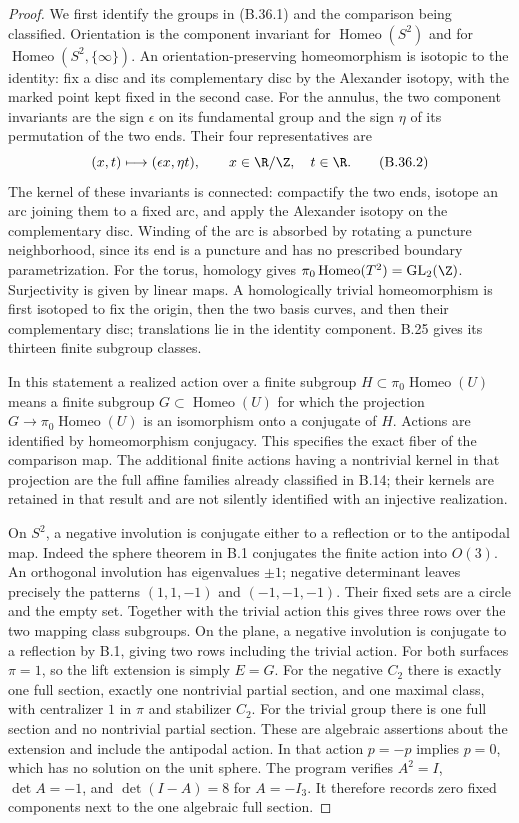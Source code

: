 \begin{proof}
We first identify the groups in (B.36.1) and the comparison being
classified.  Orientation is the component invariant for
$\operatorname{Homeo}(S^2)$ and for
$\operatorname{Homeo}(S^2,\{\infty\})$.
An orientation-preserving homeomorphism is isotopic to the identity:
fix a disc and its complementary disc by the Alexander isotopy,
with the marked point kept fixed in the second case.
For the annulus, the two component invariants are the sign
$\epsilon$ on its fundamental group and the sign $\eta$ of its
permutation of the two ends.  Their four representatives are
\[
       (x,t)\longmapsto(\epsilon x,\eta t),
       \qquad x\in\R/\Z,\quad t\in\R.                  \tag{B.36.2}
\]
The kernel of these invariants is connected: compactify the two
ends, isotope an arc joining them to a fixed arc, and apply the
Alexander isotopy on the complementary disc.  Winding of the arc
is absorbed by rotating a puncture neighborhood, since its end
is a puncture and has no prescribed boundary parametrization.
For the torus, homology gives
$\pi_0\operatorname{Homeo}(T^2)=\mathrm{GL}_2(\Z)$.
Surjectivity is given by linear maps.  A homologically trivial
homeomorphism is first isotoped to fix the origin, then the two
basis curves, and then their complementary disc; translations
lie in the identity component.  B.25 gives its thirteen finite
subgroup classes.

In this statement a realized action over a finite subgroup
$H\subset\pi_0\operatorname{Homeo}(U)$ means a finite subgroup
$G\subset\operatorname{Homeo}(U)$ for which the projection
$G\to\pi_0\operatorname{Homeo}(U)$ is an isomorphism onto a conjugate
of $H$.  Actions are identified by homeomorphism conjugacy.
This specifies the exact fiber of the comparison map.  The
additional finite actions having a nontrivial kernel in that
projection are the full affine families already classified in
B.14; their kernels are retained in that result and are not
silently identified with an injective realization.

On $S^2$, a negative involution is conjugate either to a reflection
or to the antipodal map.  Indeed the sphere theorem in B.1 conjugates
the finite action into $O(3)$.  An orthogonal involution has
eigenvalues $\pm1$; negative determinant leaves precisely the
patterns $(1,1,-1)$ and $(-1,-1,-1)$.  Their fixed sets are a
circle and the empty set.  Together with the trivial action this
gives three rows over the two mapping class subgroups.
On the plane, a negative involution is conjugate to a reflection
by B.1, giving two rows including the trivial action.
For both surfaces $\pi=1$, so the lift extension is simply
$E=G$.  For the negative $C_2$ there is exactly one full section,
exactly one nontrivial partial section, and one maximal class,
with centralizer $1$ in $\pi$ and stabilizer $C_2$.
For the trivial group there is one full section and no nontrivial
partial section.  These are algebraic assertions about the
extension and include the antipodal action.  In that action
$p=-p$ implies $p=0$, which has no solution on the unit sphere.
The program verifies $A^2=I$, $\det A=-1$, and $\det(I-A)=8$
for $A=-I_3$.  It therefore records zero fixed components next
to the one algebraic full section.


\end{proof}

